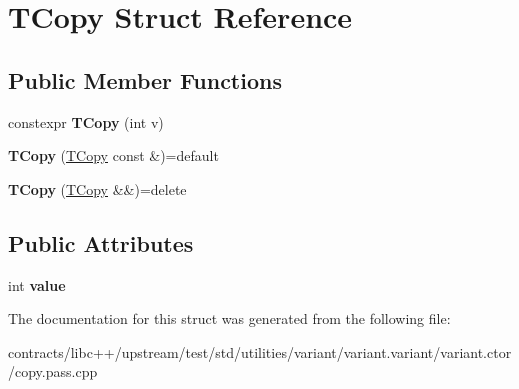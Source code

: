 \hypertarget{struct_t_copy}{}\section{T\+Copy Struct Reference}
\label{struct_t_copy}
\subsection*{Public Member Functions}
\begin{DoxyCompactItemize}
\item 
\mbox{\label{struct_t_copy_a96f0790fcda99f19cca6fc6c01ed80a7}} 
constexpr {\bfseries T\+Copy} (int v)
\item 
\mbox{\label{struct_t_copy_ab45fbe65aafe7cbc2396b6e469ee4bcf}} 
{\bfseries T\+Copy} (\mbox{\hyperlink{struct_t_copy}{T\+Copy}} const \&)=default
\item 
\mbox{\label{struct_t_copy_a5a50542da7d04ae91d3817346c0ad94f}} 
{\bfseries T\+Copy} (\mbox{\hyperlink{struct_t_copy}{T\+Copy}} \&\&)=delete
\end{DoxyCompactItemize}
\subsection*{Public Attributes}
\begin{DoxyCompactItemize}
\item 
\mbox{\label{struct_t_copy_a4835951387f86d8df179a37dc0d8637c}} 
int {\bfseries value}
\end{DoxyCompactItemize}


The documentation for this struct was generated from the following file\+:\begin{DoxyCompactItemize}
\item 
contracts/libc++/upstream/test/std/utilities/variant/variant.\+variant/variant.\+ctor/copy.\+pass.\+cpp\end{DoxyCompactItemize}
